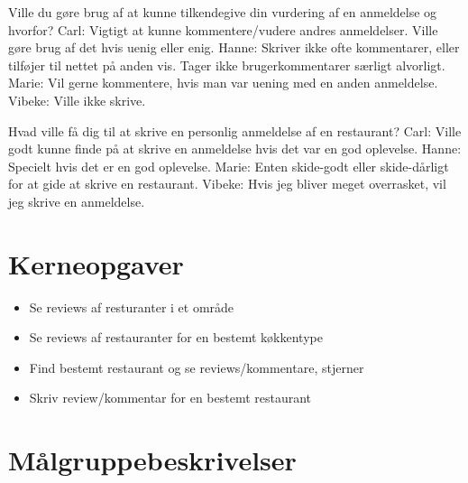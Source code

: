 \documentclass[a4paper, 12pt]{article}
\begin{document}
  Ville du gøre brug af at kunne tilkendegive din vurdering af en anmeldelse
  og hvorfor?
    Carl: Vigtigt at kunne kommentere/vudere andres anmeldelser. Ville gøre brug af det hvis uenig eller enig.
    Hanne: Skriver ikke ofte kommentarer, eller tilføjer til nettet på anden vis. Tager ikke brugerkommentarer særligt alvorligt.
    Marie: Vil gerne kommentere, hvis man var uening med en anden anmeldelse.
    Vibeke: Ville ikke skrive.

  Hvad ville få dig til at skrive en personlig anmeldelse af en restaurant?
    Carl: Ville godt kunne finde på at skrive en anmeldelse hvis det var en god oplevelse.
    Hanne: Specielt hvis det er en god oplevelse.
    Marie: Enten skide-godt eller skide-dårligt for at gide at skrive en restaurant.
    Vibeke: Hvis jeg bliver meget overrasket, vil jeg skrive en anmeldelse.

\section{Kerneopgaver}
\label{sec:Kerneopgaver}
\begin{itemize}
\item Se reviews af resturanter i et område
\item Se reviews af restauranter for en bestemt køkkentype
\item Find bestemt restaurant og se reviews/kommentare, stjerner
\item Skriv review/kommentar for en bestemt restaurant
\end{itemize}

\section{Målgruppebeskrivelser}
\label{sec:Maalgruppebeskrivelser}
\end{document}
